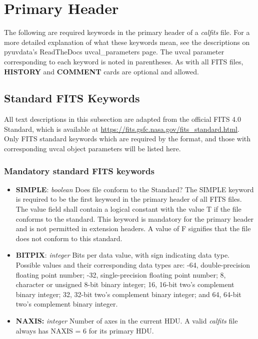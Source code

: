 \documentclass[11pt, oneside, english]{article}   	%
\begin{document}
\section{Primary Header}
The following are required keywords in the primary header of a \emph{calfits} file.
For a more detailed explanation of what these keywords mean, see the descriptions on pyuvdata's ReadTheDocs uvcal\_parameters page. The uvcal parameter corresponding to each keyword is noted in parentheses. 
As with all FITS files, \textbf{HISTORY} and \textbf{COMMENT} cards are optional and allowed.
\subsection{Standard FITS Keywords}
All text descriptions in this subsection are adapted from the official FITS 4.0 Standard, which is available at \url{https://fits.gsfc.nasa.gov/fits_standard.html}.
Only FITS standard keywords which are required by the format, and those with corresponding uvcal object parameters will be listed here.
	\subsubsection{Mandatory standard FITS keywords}
	\begin{itemize}
	\item{\textbf{SIMPLE}: \emph{boolean} Does file conform to the Standard? The SIMPLE keyword is required to be the first keyword in
	the primary header of all FITS files. The value field shall contain a logical constant with the value T if the file conforms to the standard.  This keyword is mandatory for the primary header and is not permitted in extension headers.  A value of F signifies that the file does not conform to this standard.}
	\item{\textbf{BITPIX}: \emph{integer} Bits per data value, with sign indicating data type. Possible values and their corresponding data types are: -64, double-precision floating point number; -32, single-precision floating point number; 8, character or unsigned 8-bit binary integer; 16, 16-bit two’s complement binary integer; 32, 32-bit two’s complement binary integer; and 64, 64-bit two’s complement binary integer.}
	\item{\textbf{NAXIS:} \emph{integer} Number of axes in the current HDU. A valid \emph{calfits} file always has NAXIS = 6 for its primary HDU.}
	\end{itemize}
\end{document}
